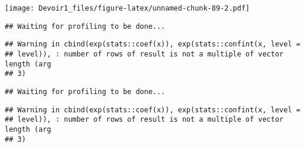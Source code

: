 \documentclass[]{article}
\newenvironment{Shaded}{\begin{snugshade}}{\end{snugshade}}
\newcommand{\KeywordTok}[1]{\textcolor[rgb]{0.13,0.29,0.53}{\textbf{#1}}}
\newcommand{\DataTypeTok}[1]{\textcolor[rgb]{0.13,0.29,0.53}{#1}}
\newcommand{\DecValTok}[1]{\textcolor[rgb]{0.00,0.00,0.81}{#1}}
\newcommand{\StringTok}[1]{\textcolor[rgb]{0.31,0.60,0.02}{#1}}
\newcommand{\OperatorTok}[1]{\textcolor[rgb]{0.81,0.36,0.00}{\textbf{#1}}}
\newcommand{\NormalTok}[1]{#1}
\begin{document}
\texttt{[image: Devoir1\_files/figure-latex/unnamed-chunk-89-2.pdf]}

\begin{Shaded}
\end{Shaded}

\begin{verbatim}
## Waiting for profiling to be done...
\end{verbatim}

\begin{verbatim}
## Warning in cbind(exp(stats::coef(x)), exp(stats::confint(x, level =
## level)), : number of rows of result is not a multiple of vector length (arg
## 3)
\end{verbatim}

\begin{verbatim}
## Waiting for profiling to be done...
\end{verbatim}

\begin{verbatim}
## Warning in cbind(exp(stats::coef(x)), exp(stats::confint(x, level =
## level)), : number of rows of result is not a multiple of vector length (arg
## 3)
\end{verbatim}
\end{document}
